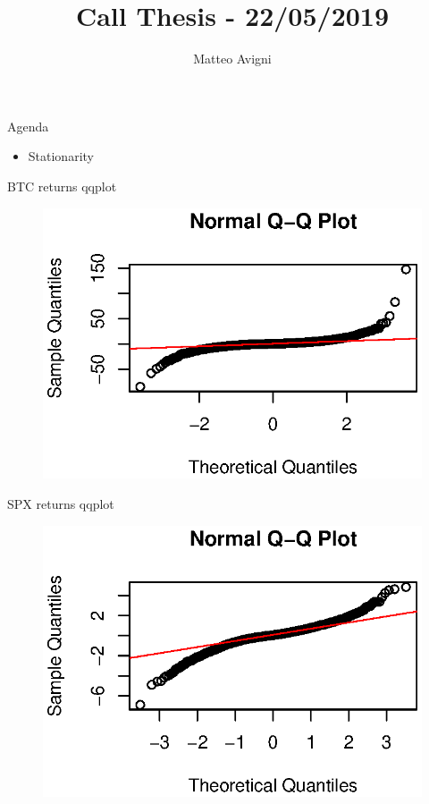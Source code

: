 \documentclass{beamer}
\title{Call Thesis - 22/05/2019}
\author{Matteo Avigni}
\begin{document}
\begin{frame}[plain]
    \maketitle
\end{frame}
\begin{frame}{Agenda}
	\begin{itemize}
		\item Stationarity
	\end{itemize}


\end{frame}
\begin{frame}{BTC returns qqplot}
	\begin{figure}[linewidth=250mm]	
		\includegraphics{BTCqqplot.eps}
	\end{figure}
\end{frame}
\begin{frame}{SPX returns qqplot}
	\begin{figure}[b]	
		\includegraphics{SPXqqplot.eps}
	\end{figure}
\end{frame}
\end{document}
